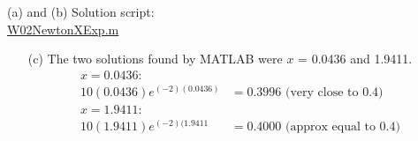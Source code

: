\begin{enumerate}[1.]
\begin{multicols}{2}
  \begin{Solution}
(a) and (b)  Solution script:  \\
\href{http://www.mast.queensu.ca/~apsc171/MNTCP01/PracticeProblems/MATLAB/W02NewtonXExp.m}{W02NewtonXExp.m}


\begin{enumerate}
\item[(c)]  The two solutions found by MATLAB were $x$ = 0.0436 and 1.9411. \\
  \begin{align*}
   x  = 0.0436: & \\    10 (0.0436) e^{(-2)(0.0436)} & = 0.3996 \mbox{ (very close to 0.4)} \\
   x  = 1.9411: &  \\  10 (1.9411) e^{(-2)(1.9411} & = 0.4000 \mbox{ (approx equal to 0.4)} 
  \end{align*}
\end{enumerate}

\par\end{Solution}
\end{multicols}

\end{enumerate}

